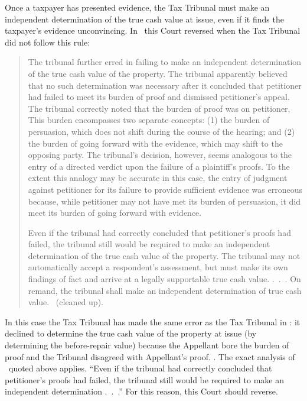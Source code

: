 \documentclass[12pt,\documentclassflag]{michiganCourtOfAppealsBrief}
\begin{document}
Once a taxpayer has presented evidence, the Tax Tribunal must make an independent determination of the true cash value at issue, even if it finds the taxpayer's evidence unconvincing. In \cite{Jones & Laughlin}\ this Court reversed when the Tax Tribunal did not follow this rule:

\begin{quotation}
	The tribunal further erred in failing to make an independent determination of the true cash value of the property. The tribunal apparently believed that no such determination was necessary after it concluded that petitioner had failed to meet its burden of proof and dismissed petitioner's appeal. The tribunal correctly noted that the burden of proof was on petitioner, This burden encompasses two separate concepts: (1) the burden of persuasion, which does not shift during the course of the hearing; and (2) the burden of going forward with the evidence, which may shift to the opposing party. The tribunal's decision, however, seems analogous to the entry of a directed verdict upon the failure of a plaintiff's proofs. To the extent this analogy may be accurate in this case, the entry of judgment against petitioner for its failure to provide sufficient evidence was erroneous because, while petitioner may not have met its burden of persuasion, it did meet its burden of going forward with evidence.
	
	Even if the tribunal had correctly concluded that petitioner's proofs had failed, the tribunal still would be required to make an independent determination of the true cash value of the property. The tribunal may not automatically accept a respondent's assessment, but must make its own findings of fact and arrive at a legally supportable true cash value. .~.~. On remand, the tribunal shall make an independent determination of true cash value. \ (cleaned up).
\end{quotation}

In this case the Tax Tribunal has made the same error as the Tax Tribunal in \cite[s]{Jones & Laughlin}: it declined to determine the true cash value of the property at issue (by determining the before-repair value) because the Appellant bore the burden of proof and the Tribunal disagreed with Appellant's proof. \reconsiderationDenied[2]. The exact analysis of \cite[s]{Jones & Laughlin}\ quoted above applies. ``Even if the tribunal had correctly concluded that petitioner's proofs had failed, the tribunal still would be required to make an independent determination .~.~.'' For this reason, this Court should reverse.
\end{document}
